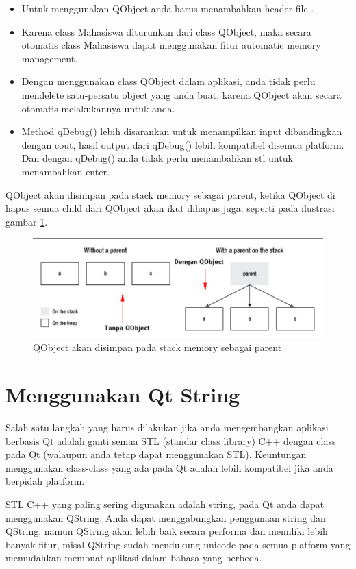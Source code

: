 \begin{itemize}

\item
  Untuk menggunakan QObject anda harus menambahkan header file .
\item
  Karena class Mahasiswa diturunkan dari class QObject, maka secara
  otomatis class Mahasiswa dapat menggunakan fitur automatic memory
  management.
\item
  Dengan menggunakan class QObject dalam aplikasi, anda tidak perlu
  mendelete satu-persatu object yang anda buat, karena QObject akan
  secara otomatis melakukannya untuk anda.
\item
  Method qDebug() lebih disarankan untuk menampilkan input dibandingkan
  dengan cout, hasil output dari qDebug() lebih kompatibel disemua
  platform. Dan dengan qDebug() anda tidak perlu menambahkan stl untuk
  menambahkan enter.
\end{itemize}

QObject akan disimpan pada stack memory sebagai parent, ketika QObject
di hapus semua child dari QObject akan ikut dihapus juga. seperti pada ilustrasi
gambar \ref{fig:capture11-1}.

\begin{figure}
\centering
\includegraphics[width=0.7\linewidth]{../manuscript/images/Capture11-1.png}
\caption{QObject akan disimpan pada stack memory sebagai parent}
\label{fig:capture11-1}
\end{figure}




\section{Menggunakan Qt String}\label{menggunakan-qt-string}

Salah satu langkah yang harus dilakukan jika anda mengembangkan aplikasi
berbasis Qt adalah ganti semua STL (standar class library) C++ dengan
class pada Qt (walaupun anda tetap dapat menggunakan STL). Keuntungan
menggunakan class-class yang ada pada Qt adalah lebih kompatibel jika
anda berpidah platform.

STL C++ yang paling sering digunakan adalah string, pada Qt anda dapat
menggunakan QString. Anda dapat menggabungkan penggunaan string dan
QString, namun QString akan lebih baik secara performa dan memiliki
lebih banyak fitur, misal QString sudah mendukung unicode pada semua
platform yang memudahkan membuat aplikasi dalam bahasa yang berbeda.


